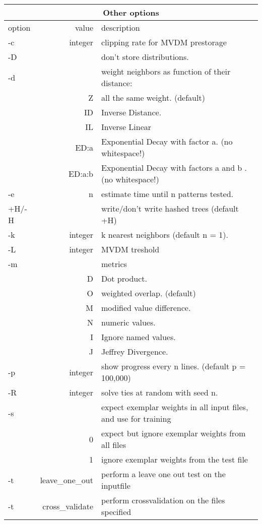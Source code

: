 \newpage

\begin{tabular}{|l|r|l|}
\hline
\multicolumn{3}{|c|}{Other options}\ \\
\hline
option & value & description \\
\hline
-c & integer  & clipping rate for MVDM prestorage \\
-D & & don't store distributions. \\
-d &     & weight neighbors as function of their distance: \\
   &  Z  & all the same weight. (default) \\
   & ID  & Inverse Distance. \\
   & IL  & Inverse Linear \\
   & ED:a & Exponential Decay with factor a. (no whitespace!) \\
   & ED:a:b & Exponential Decay with factors a and b . (no whitespace!) \\
-e & n   &  estimate time until n patterns tested. \\
+H/-H & & write/don't write hashed trees (default +H) \\
-k & integer & k nearest neighbors (default n = 1). \\
-L & integer & MVDM treshold \\
-m &   &  metrics \\
   & D & Dot product. \\
   & O & weighted overlap. (default) \\
   & M & modified value difference. \\
   & N & numeric values. \\ 
   & I & Ignore named  values. \\
   & J & Jeffrey Divergence. \\
-p & integer & show progress every n lines. (default p = 100,000) \\
-R & integer & solve ties at random with seed n. \\
-s &  & expect exemplar weights in all input files, and use for training \\
   & 0 & expect but ignore exemplar weights from all files \\
   & 1 & ignore exemplar weights from the test file \\
-t &  leave\_one\_out & perform a leave one out test on the inputfile \\
-t &  cross\_validate & perform crossvalidation on the files specified

\end{tabular}
